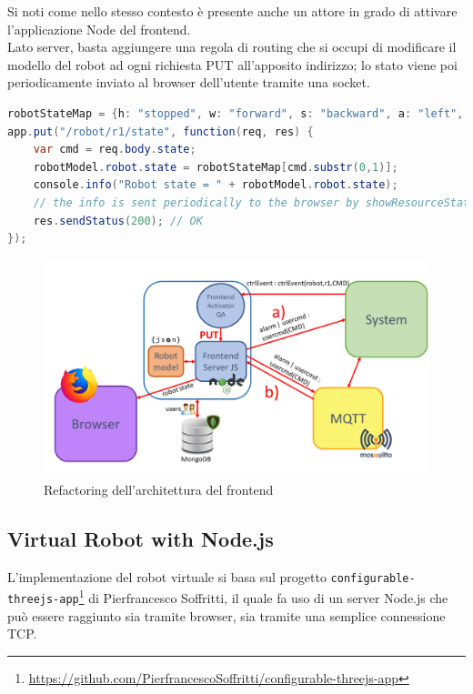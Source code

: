 \documentclass{../llncs}
\newcommand{\labelssec}[1]{\label{ssec:#1}}
\newcommand{\labelfig}[1]{\label{fig:#1}}
\begin{document}


Si noti come nello stesso contesto è presente anche un attore in grado di attivare l'applicazione Node del frontend.\\

Lato server, basta aggiungere una regola di routing che si occupi di modificare il modello del robot ad ogni richiesta PUT all'apposito indirizzo; lo stato viene poi periodicamente inviato al browser dell'utente tramite una socket.\\

\begin{lstlisting}[language=java, caption={nodeCode/frontend/applCodeRobot.js}]
robotStateMap = {h: "stopped", w: "forward", s: "backward", a: "left", d: "right"};
app.put("/robot/r1/state", function(req, res) {
	var cmd = req.body.state;
	robotModel.robot.state = robotStateMap[cmd.substr(0,1)];
	console.info("Robot state = " + robotModel.robot.state);
	// the info is sent periodically to the browser by showResourceState() in robotFrontendServer.js
	res.sendStatus(200); // OK
});
\end{lstlisting}

\begin{figure}
\centering
\includegraphics[scale=0.40]{img/frontendServerRefactoring.png}
\caption{Refactoring dell'architettura del frontend}\labelfig{frontendServerRefactoring}
\end{figure}

\subsection{Virtual Robot with Node.js}
\labelssec{robotNodeImpl}
L'implementazione del robot virtuale si basa sul progetto \texttt{configurable-threejs-app}\footnote{\url{https://github.com/PierfrancescoSoffritti/configurable-threejs-app}} di Pierfrancesco Soffritti, il quale fa uso di un server Node.js che può essere raggiunto sia tramite browser, sia tramite una semplice connessione TCP.
\end{document}
